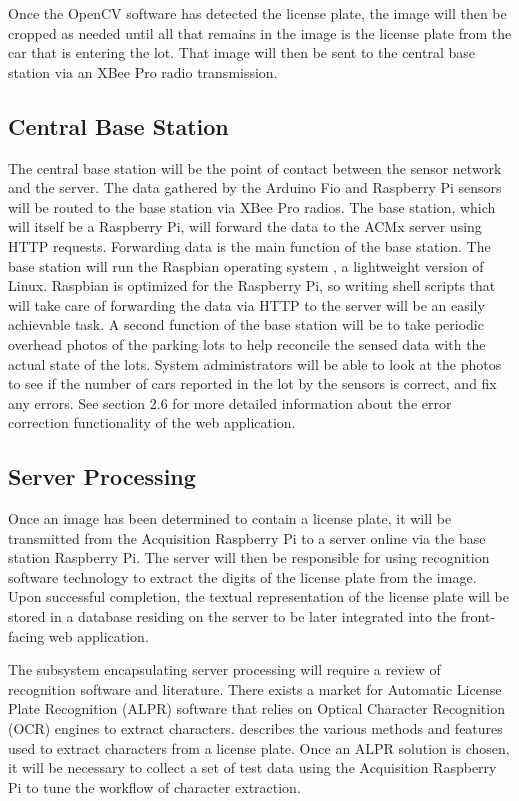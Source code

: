 \documentclass[11pt, oneside, fullpage, doublespace]{article}
\begin{document}
Once the OpenCV software has detected the license plate, the image will then be cropped as needed until all that remains in the image is the license plate from the car that is entering the lot. That image will then be sent to the central base station via an XBee Pro radio transmission.

\subsection{Central Base Station}
The central base station will be the point of contact between the sensor network and the server. The data gathered by the Arduino Fio and Raspberry Pi sensors will be routed to the base station via XBee Pro radios. The base station, which will itself be a Raspberry Pi, will forward the data to the ACMx server using HTTP requests. Forwarding data is the main function of the base station. The base station will run the Raspbian operating system \cite{raspbian}, a lightweight version of Linux. Raspbian is optimized for the Raspberry Pi, so writing shell scripts that will take care of forwarding the data via HTTP to the server will be an easily achievable task. A second function of the base station will be to take periodic overhead photos of the parking lots to help reconcile the sensed data with the actual state of the lots. System administrators will be able to look at the photos to see if the number of cars reported in the lot by the sensors is correct, and fix any errors. See section 2.6 for more detailed information about the error correction functionality of the web application.


\subsection{Server Processing}
Once an image has been determined to contain a license plate, it will be transmitted from the Acquisition Raspberry Pi to a server online via the base station Raspberry Pi. The server will then be responsible for using recognition software technology to extract the digits of the license plate from the image. Upon successful completion, the textual representation of the license plate will be stored in a database residing on the server to be later integrated into the front-facing web application.

The subsystem encapsulating server processing will require a review of recognition software and literature. There exists a market for Automatic License Plate Recognition (ALPR) software that relies on Optical Character Recognition (OCR) engines to extract characters. \cite{du2013} describes the various methods and features used to extract characters from a license plate. Once an ALPR solution is chosen, it will be necessary to collect a set of test data using the Acquisition Raspberry Pi to tune the workflow of character extraction.
\end{document}
